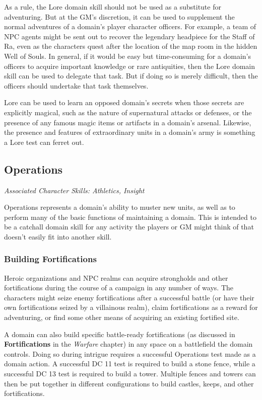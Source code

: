 \documentclass[10pt,a4paper,twoside,bg=print,twocolumn,openany,nodeprecatedcode]{dndbook}
\begin{document}
As a rule, the Lore domain skill should not be used as a substitute for adventuring. But at the GM's discretion, it can be used to supplement the normal adventures of a domain's player character officers. For example, a team of NPC agents might be sent out to recover the legendary headpiece for the Staff of Ra, even as the characters quest after the location of the map room in the hidden Well of Souls. In general, if it would be easy but time-consuming for a domain's officers to acquire important knowledge or rare antiquities, then the Lore domain skill can be used to delegate that task. But if doing so is merely difficult, then the officers should undertake that task themselves.

Lore can be used to learn an opposed domain's secrets when those secrets are explicitly magical, such as the nature of supernatural attacks or defenses, or the presence of any famous magic items or artifacts in a domain's arsenal. Likewise, the presence and features of extraordinary units in a domain's army is something a Lore test can ferret out.

\subsection{Operations}
\textit{Associated Character Skills: Athletics, Insight}

Operations represents a domain's ability to muster new units, as well as to perform many of the basic functions of maintaining a domain. This is intended to be a catchall domain skill for any activity the players or GM might think of that doesn't easily fit into another skill.

\subsubsection{Building Fortifications}
Heroic organizations and NPC realms can acquire strongholds and other fortifications during the course of a campaign in any number of ways. The characters might seize enemy fortifications after a successful battle (or have their own fortifications seized by a villainous realm), claim fortifications as a reward for adventuring, or find some other means of acquiring an existing fortified site.

A domain can also build specific battle-ready fortifications (as discussed in \textbf{Fortifications} in the \textit{Warfare} chapter) in any space on a battlefield the domain controls. Doing so during intrigue requires a successful Operations test made as a domain action. A successful DC 11 test is required to build a stone fence, while a successful DC 13 test is required to build a tower. Multiple fences and towers can then be put together in different configurations to build castles, keeps, and other fortifications.
\end{document}
